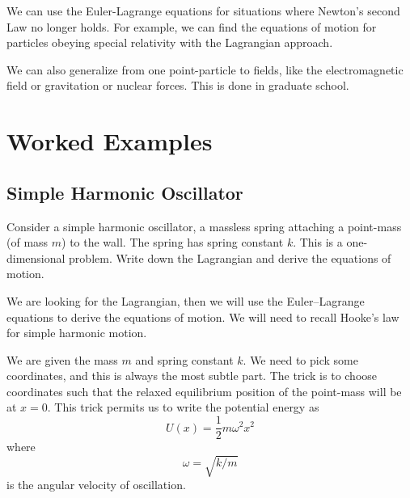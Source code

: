 We can use the Euler-Lagrange equations for situations where Newton's
second Law no longer holds. For example, we can find the equations of
motion for particles obeying special relativity with the Lagrangian
approach.

We can also generalize from one point-particle to fields, like the
electromagnetic field or gravitation or nuclear forces. This is done in
graduate school.

\section{Worked Examples}

\subsection{Simple Harmonic Oscillator}

Consider a simple harmonic oscillator, a massless spring attaching a
point-mass (of mass $m$) to the wall. The spring has spring constant $k$.
This is a one-dimensional problem. Write down the Lagrangian and derive
the equations of motion.

We are looking for the Lagrangian, then we will use the Euler--Lagrange
equations to derive the equations of motion. We will need to recall
Hooke's law for simple harmonic motion.

We are given the mass $m$ and spring constant $k$. We need to pick some
coordinates, and this is always the most subtle part. The trick is to
choose coordinates such that the relaxed equilibrium position of the
point-mass will be at $x=0$. This trick permits us to write the
potential energy as
\begin{equation}
U(x) = \frac{1}{2}m\omega^{2}x^{2}
\end{equation}
where
\begin{equation}
\omega = \sqrt{k/m}
\end{equation}
is the angular velocity of oscillation.

